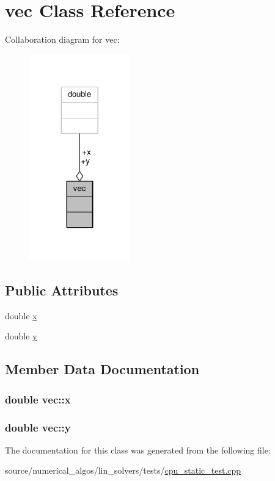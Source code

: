 \hypertarget{classvec}{\section{vec Class Reference}
\label{classvec}
}


Collaboration diagram for vec\-:
\nopagebreak
\begin{figure}[H]
\begin{center}
\leavevmode
\includegraphics[width=124pt]{classvec__coll__graph}
\end{center}
\end{figure}
\subsection*{Public Attributes}
\begin{DoxyCompactItemize}
\item 
double \hyperlink{classvec_a16a7eee63e3b1d82978695a7064a7fc6}{x}
\item 
double \hyperlink{classvec_ad7effb515272b2f1010b88a97c90a8c2}{y}
\end{DoxyCompactItemize}


\subsection{Member Data Documentation}
\hypertarget{classvec_a16a7eee63e3b1d82978695a7064a7fc6}{
\subsubsection[{x}]{\setlength{\rightskip}{0pt plus 5cm}double vec\-::x}}\label{classvec_a16a7eee63e3b1d82978695a7064a7fc6}
\hypertarget{classvec_ad7effb515272b2f1010b88a97c90a8c2}{
\subsubsection[{y}]{\setlength{\rightskip}{0pt plus 5cm}double vec\-::y}}\label{classvec_ad7effb515272b2f1010b88a97c90a8c2}


The documentation for this class was generated from the following file\-:\begin{DoxyCompactItemize}
\item 
source/numerical\-\_\-algos/lin\-\_\-solvers/tests/\hyperlink{cpu__static__test_8cpp}{cpu\-\_\-static\-\_\-test.\-cpp}\end{DoxyCompactItemize}
